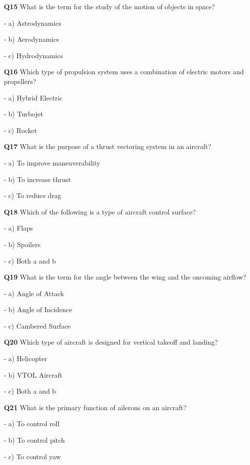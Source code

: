 \textbf{Q15} What is the term for the study of the motion of objects in space?\par
\quad - a) Astrodynamics\par
\quad - b) Aerodynamics\par
\quad - c) Hydrodynamics\par

\textbf{Q16} Which type of propulsion system uses a combination of electric motors and propellers?\par
\quad - a) Hybrid Electric\par
\quad - b) Turbojet\par
\quad - c) Rocket\par

\textbf{Q17} What is the purpose of a thrust vectoring system in an aircraft?\par
\quad - a) To improve maneuverability\par
\quad - b) To increase thrust\par
\quad - c) To reduce drag\par

\textbf{Q18} Which of the following is a type of aircraft control surface?\par
\quad - a) Flaps\par
\quad - b) Spoilers\par
\quad - c) Both a and b\par

\textbf{Q19} What is the term for the angle between the wing and the oncoming airflow?\par
\quad - a) Angle of Attack\par
\quad - b) Angle of Incidence\par
\quad - c) Cambered Surface\par

\textbf{Q20} Which type of aircraft is designed for vertical takeoff and landing?\par
\quad - a) Helicopter\par
\quad - b) VTOL Aircraft\par
\quad - c) Both a and b\par

\textbf{Q21} What is the primary function of ailerons on an aircraft?\par
\quad - a) To control roll\par
\quad - b) To control pitch\par
\quad - c) To control yaw\par

